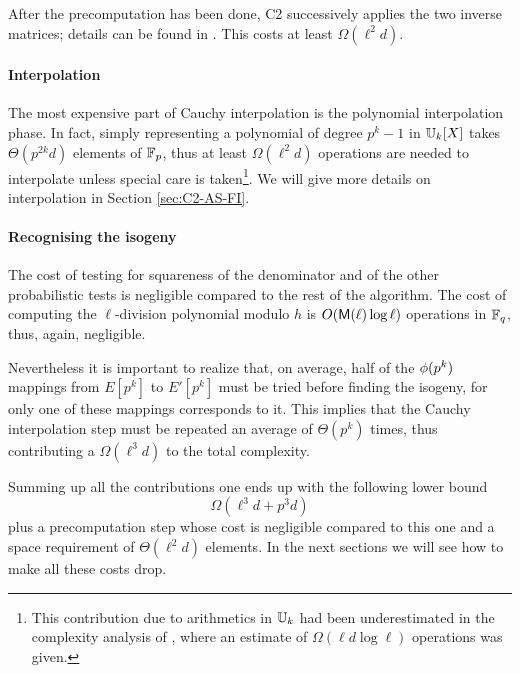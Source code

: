 After the precomputation has been done, C2 successively applies the
two inverse matrices; details can be found in
\cite[$\S$2.4]{Cou96}. This costs at least $\Omega(\ell^2d)$.


\paragraph{Interpolation}
The most expensive part of Cauchy interpolation is the polynomial
interpolation phase. In fact, simply representing a polynomial of
degree $p^k-1$ in $\mathbb{U}_k[X]$ takes $\Theta(p^{2k}d)$ elements of
$\mathbb{F}_p$, thus at least $\Omega(\ell^2d)$ operations are needed to
interpolate unless special care is taken\footnote{This contribution
  due to arithmetics in $\mathbb{U}_k$ had been underestimated in the
  complexity analysis of \cite{Cou96}, where an estimate of
  $\Omega(\ell d\log\ell)$ operations was given.}. We will give more
details on interpolation in Section \ref{sec:C2-AS-FI}.


\paragraph{Recognising the isogeny}
The cost of testing for squareness of the denominator and of the other
probabilistic tests is negligible compared to the rest of the
algorithm. The cost of computing the $\ell$-division polynomial modulo
$h$ is $O(\mathrm{\sf M}(\ell)\log\ell)$ operations in $\mathbb{F}_q$, thus, again,
negligible.

Nevertheless it is important to realize that, on average, half of the
$\phi(p^k)$ mappings from $E[p^k]$ to $E'[p^k]$ must be tried before
finding the isogeny, for only one of these mappings corresponds to
it. This implies that the Cauchy interpolation step must be repeated
an average of $\Theta(p^k)$ times, thus contributing a
$\Omega(\ell^3d)$ to the total complexity.

Summing up all the contributions one ends up with the following lower
bound
\begin{equation}
  \label{eq:C2:complexity}
  \Omega(\ell^3d + p^3d)
\end{equation}
plus a precomputation step whose cost is negligible compared to this
one and a space requirement of $\Theta(\ell^2d)$ elements. In the next
sections we will see how to make all these costs drop.



